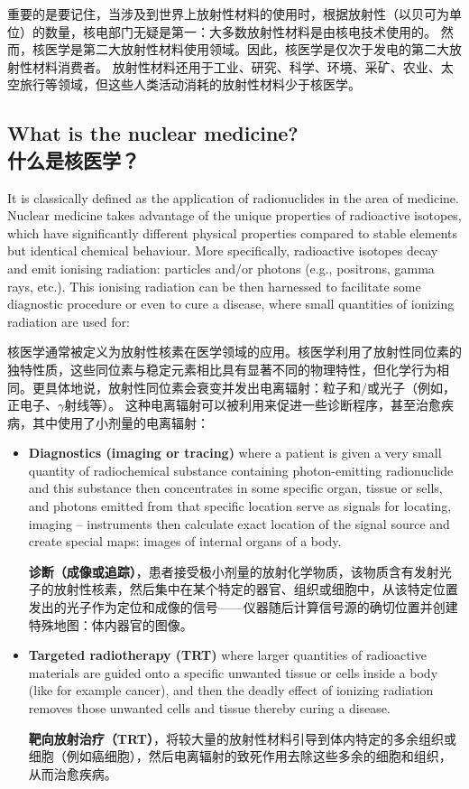 \documentclass[dvipsnames, svgnames,a4paper,11pt]{article}
\begin{document}
重要的是要记住，当涉及到世界上放射性材料的使用时，根据放射性（以贝可为单位）的数量，核电部门无疑是第一：大多数放射性材料是由核电技术使用的。 然而，核医学是第二大放射性材料使用领域。因此，核医学是仅次于发电的第二大放射性材料消费者。  放射性材料还用于工业、研究、科学、环境、采矿、农业、太空旅行等领域，但这些人类活动消耗的放射性材料少于核医学。
\subsection{What is the nuclear medicine?\\什么是核医学？}

It is classically defined as the application of radionuclides in the area of medicine. Nuclear medicine takes advantage of the unique properties of radioactive isotopes, which have significantly different physical properties compared to stable elements but identical chemical behaviour. More specifically, radioactive isotopes decay and emit ionising radiation: particles and/or photons (e.g., positrons, gamma rays, etc.).
This ionising radiation can be then harnessed to facilitate some diagnostic procedure or even to cure a disease, where small quantities of ionizing radiation are used for:

核医学通常被定义为放射性核素在医学领域的应用。核医学利用了放射性同位素的独特性质，这些同位素与稳定元素相比具有显著不同的物理特性，但化学行为相同。更具体地说，放射性同位素会衰变并发出电离辐射：粒子和/或光子（例如，正电子、$\gamma$射线等）。  这种电离辐射可以被利用来促进一些诊断程序，甚至治愈疾病，其中使用了小剂量的电离辐射：

\begin{itemize}
      \item \textbf{Diagnostics (imaging or tracing)} where a patient is given a very small quantity of radiochemical substance containing photon-emitting radionuclide and this substance then concentrates in some specific organ, tissue or sells, and photons emitted from that specific location serve as signals for locating, imaging – instruments then calculate exact location of the signal source and create special maps: images of internal organs of a body.

            \textbf{诊断（成像或追踪）}，患者接受极小剂量的放射化学物质，该物质含有发射光子的放射性核素，然后集中在某个特定的器官、组织或细胞中，从该特定位置发出的光子作为定位和成像的信号——仪器随后计算信号源的确切位置并创建特殊地图：体内器官的图像。
      \item \textbf{Targeted radiotherapy (TRT)} where larger quantities of radioactive materials are guided onto a specific unwanted tissue or cells inside a body (like for example cancer), and then the deadly effect of ionizing radiation removes those unwanted cells and tissue thereby curing a disease.

            \textbf{靶向放射治疗（TRT）}，将较大量的放射性材料引导到体内特定的多余组织或细胞（例如癌细胞），然后电离辐射的致死作用去除这些多余的细胞和组织，从而治愈疾病。
\end{itemize}
\end{document}
